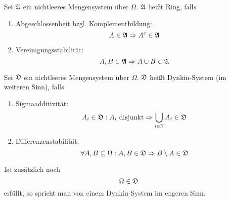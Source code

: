 		\begin{defi}[Algebra]
			Sei $\mathfrak{A}$ ein nichtleeres Mengensystem über $\Omega$. $\mathfrak{A}$ heißt Ring, falls
			\begin{enumerate}
				\item Abgeschlossenheit bzgl. Komplementbildung:
				\[ A\in\mathfrak{A}\Rightarrow A^c\in\mathfrak{A} \]
				\item Vereinigungsstabilität:
				\[ A,B\in\mathfrak{A}\Rightarrow A\cup B\in\mathfrak{A} \]
			\end{enumerate}
		\end{defi}
		
		\begin{defi}
			Sei $\mathfrak{D}$ ein nichtleeres Mengensystem über $\Omega$. $\mathfrak{D}$ heißt Dynkin-System (im weiteren Sinn), falls
			\begin{enumerate}
				\item Sigmaadditivität:
					\[A_i\in\mathfrak{D}: A_i \text{ disjunkt}\Rightarrow \bigcup_{i\in\mathbb{N}} A_i\in\mathfrak{D}\] 
				\item Differenzenstabilität:
					\[ \forall A,B\subseteq \Omega: A,B\in\mathfrak{D}\Rightarrow B\setminus A\in\mathfrak{D}\]
			\end{enumerate}
			Ist zusätzlich noch
			\[ \Omega\in\mathfrak{D} \]
			erfüllt, so spricht man von einem Dynkin-System im engeren Sinn.
		\end{defi}
	
